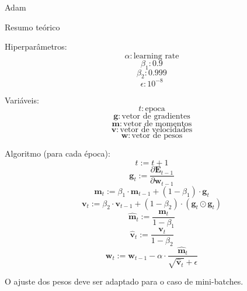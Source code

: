 \documentclass{article}
\begin{document}
\centerline{\sc \large Adam}
\vspace{.5pc}
\centerline{\sc Resumo teórico}
\vspace{4pc}

Hiperparâmetros:
\[ \alpha: \textrm{learning rate}  \]
\[ \beta_1: 0.9 \]
\[ \beta_2: 0.999 \]
\[ \epsilon: 10^{-8} \]
\vspace{3pc}

Variáveis:
\[ t: \textrm{epoca} \]
\[ \mathbf{g}: \textrm{vetor de gradientes} \]
\[ \mathbf{m}: \textrm{vetor de momentos} \]
\[ \mathbf{v}: \textrm{vetor de velocidades} \]
\[ \mathbf{w}: \textrm{vetor de pesos} \]
\vspace{3pc}

Algoritmo (para cada época):
\[ t := t + 1 \]
\[ \mathbf{g}_t := \frac{\partial \mathbf{E}_{t-1}}{\partial \mathbf{w}_{t-1}} \]
\[ \mathbf{m}_t := \beta_1 \cdot \mathbf{m}_{t-1} + (1 - \beta_1) \cdot \mathbf{g}_t \]
\[ \mathbf{v}_t := \beta_2 \cdot \mathbf{v}_{t-1} + (1 - \beta_2) \cdot (\mathbf{g}_t \odot \mathbf{g}_t) \]
\[ \mathbf{\hat{m}}_t := \frac{\mathbf{m}_t}{1 - \beta_1} \]
\[ \mathbf{\hat{v}}_t := \frac{\mathbf{v}_t}{1 - \beta_2} \]
\[ \mathbf{w}_t := \mathbf{w}_{t-1} - \alpha \cdot \frac{\mathbf{\hat{m}}_t}{\sqrt{\mathbf{\hat{v}}_t} + \epsilon} \]
\vspace{3pc}

O ajuste dos pesos deve ser adaptado para o caso de mini-batches.
\end{document}
